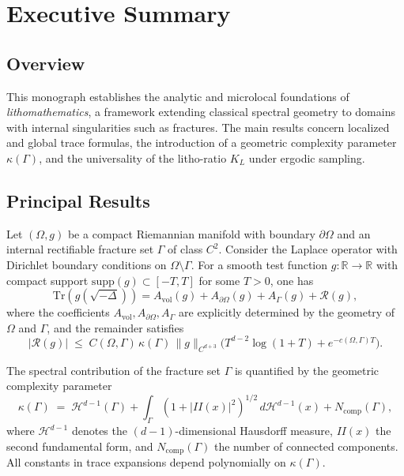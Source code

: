 
\chapter*{Executive Summary}
\label{chap:executive-summary}

\section*{Overview}

This monograph establishes the analytic and microlocal foundations of 
\emph{lithomathematics}, a framework extending classical spectral geometry 
to domains with internal singularities such as fractures. 
The main results concern localized and global trace formulas, 
the introduction of a geometric complexity parameter $\kappa(\Gamma)$, 
and the universality of the litho-ratio $K_L$ under ergodic sampling. 

\section*{Principal Results}

\begin{theorem} 
\label{thm:trace}
Let $(\Omega,g)$ be a compact Riemannian manifold with boundary $\partial\Omega$ 
and an internal rectifiable fracture set $\Gamma$ of class $C^2$. 
Consider the Laplace operator with Dirichlet boundary conditions on $\Omega\setminus\Gamma$. 
For a smooth test function $g:\mathbb{R}\to\mathbb{R}$ with compact support 
$\mathrm{supp}(g)\subset [-T,T]$ for some $T>0$, one has
\[
    \mathrm{Tr}\!\left(g(\sqrt{-\Delta})\right) 
    = A_{\mathrm{vol}}(g) + A_{\partial\Omega}(g) + A_{\Gamma}(g) + \mathcal{R}(g),
\]
where the coefficients $A_{\mathrm{vol}},A_{\partial\Omega},A_{\Gamma}$ are explicitly determined 
by the geometry of $\Omega$ and $\Gamma$, and the remainder satisfies
\[
    |\mathcal{R}(g)| 
    \;\leq\; C(\Omega,\Gamma)\,\kappa(\Gamma)\,\|g\|_{C^{d+3}}
        \Big( T^{d-2}\log(1+T) + e^{-c(\Omega,\Gamma) T}\Big).
\]
\end{theorem}

\begin{theorem} 
\label{thm:complexity}
The spectral contribution of the fracture set $\Gamma$ is quantified by the 
geometric complexity parameter
\[
    \kappa(\Gamma) \;=\; 
        \mathcal{H}^{d-1}(\Gamma) 
        + \int_\Gamma (1+|II(x)|^2)^{1/2}\,d\mathcal{H}^{d-1}(x) 
        + N_{\mathrm{comp}}(\Gamma),
\]
where $\mathcal{H}^{d-1}$ denotes the $(d-1)$-dimensional Hausdorff measure, 
$II(x)$ the second fundamental form, and $N_{\mathrm{comp}}(\Gamma)$ the number of connected components. 
All constants in trace expansions depend polynomially on $\kappa(\Gamma)$.
\end{theorem}

